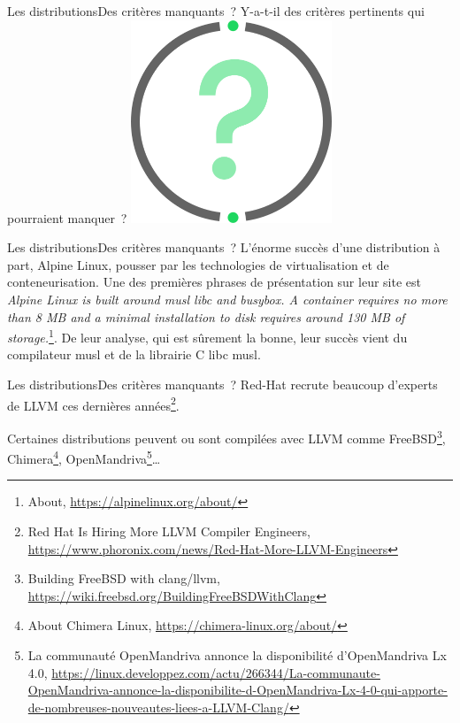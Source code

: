\documentclass{beamer}
\begin{document}
    \begin{frame}{Les distributions}{Des critères manquants~?}
        Y-a-t-il des critères pertinents qui pourraient manquer~?
        \bigbreak
        \centering
        \includegraphics[width=6cm]{image/question-mark}
    \end{frame}

    \begin{frame}{Les distributions}{Des critères manquants~?}
        L'énorme succès d'une distribution à part, Alpine Linux, pousser par les technologies de virtualisation et de conteneurisation.
        \bigbreak
        Une des premières phrases de présentation sur leur site est \textit{Alpine Linux is built around musl libc and busybox. A container requires no more than 8 MB and a minimal installation to disk requires around 130 MB of storage.}\footnote{About, \url{https://alpinelinux.org/about/}}.
        \bigbreak
        De leur analyse, qui est sûrement la bonne, leur succès vient du compilateur musl et de la librairie C libc musl.
    \end{frame}

    \begin{frame}{Les distributions}{Des critères manquants~?}
        Red-Hat recrute beaucoup d'experts de LLVM ces dernières années\footnote{Red Hat Is Hiring More LLVM Compiler Engineers, \url{https://www.phoronix.com/news/Red-Hat-More-LLVM-Engineers}}.

        Certaines distributions peuvent ou sont compilées avec LLVM comme FreeBSD\footnote{Building FreeBSD with clang/llvm, \url{https://wiki.freebsd.org/BuildingFreeBSDWithClang}}, Chimera\footnote{About Chimera Linux, \url{https://chimera-linux.org/about/}}, OpenMandriva\footnote{La communauté OpenMandriva annonce la disponibilité d'OpenMandriva Lx 4.0, \url{https://linux.developpez.com/actu/266344/La-communaute-OpenMandriva-annonce-la-disponibilite-d-OpenMandriva-Lx-4-0-qui-apporte-de-nombreuses-nouveautes-liees-a-LLVM-Clang/}}\ldots
    \end{frame}
\end{document}
